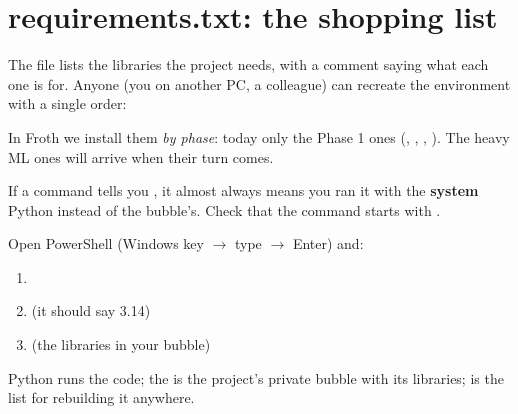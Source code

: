 \documentclass[11pt,a4paper]{article}
\begin{document}
\section{requirements.txt: the shopping list}

The  file lists the libraries the project needs, with a comment
saying what each one is for. Anyone (you on another PC, a colleague) can recreate the
environment with a single order:
\begin{center}
\end{center}
In Froth we install them \emph{by phase}: today only the Phase 1 ones (,
, , ). The heavy ML ones will arrive when
their turn comes.

\begin{ojo}
If a command tells you , it almost
always means you ran it with the \textbf{system} Python instead of the bubble's. Check that
the command starts with .
\end{ojo}

\begin{practica}
Open PowerShell (Windows key $\rightarrow$ type  $\rightarrow$ Enter) and:
\begin{enumerate}
  \item {}
  \item {} \quad (it should say 3.14)
  \item {} \quad (the libraries in your bubble)
\end{enumerate}
\end{practica}

\begin{resumen}
Python runs the code; the  is the project's private bubble with its libraries;
 is the list for rebuilding it anywhere.
\end{resumen}
\end{document}
